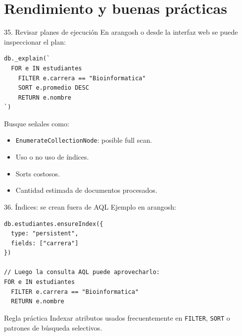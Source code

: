 \documentclass[aspectratio=169,11pt]{beamer}
\begin{document}
\section{Rendimiento y buenas prácticas}

\begin{frame}[fragile]{35. Revisar planes de ejecución}
En arangosh o desde la interfaz web se puede inspeccionar el plan:

\begin{lstlisting}[language=AQL]
db._explain(`
  FOR e IN estudiantes
    FILTER e.carrera == "Bioinformatica"
    SORT e.promedio DESC
    RETURN e.nombre
`)
\end{lstlisting}

\vspace{0.2cm}
Busque señales como:
\begin{itemize}
  \item \texttt{EnumerateCollectionNode}: posible full scan.
  \item Uso o no uso de índices.
  \item Sorts costosos.
  \item Cantidad estimada de documentos procesados.
\end{itemize}
\end{frame}

\begin{frame}[fragile]{36. Índices: se crean fuera de AQL}
Ejemplo en arangosh:

\begin{lstlisting}[language=AQL]
db.estudiantes.ensureIndex({
  type: "persistent",
  fields: ["carrera"]
})

// Luego la consulta AQL puede aprovecharlo:
FOR e IN estudiantes
  FILTER e.carrera == "Bioinformatica"
  RETURN e.nombre
\end{lstlisting}

\begin{alertblock}{Regla práctica}
Indexar atributos usados frecuentemente en \texttt{FILTER}, \texttt{SORT} o patrones de búsqueda selectivos.
\end{alertblock}
\end{frame}
\end{document}
